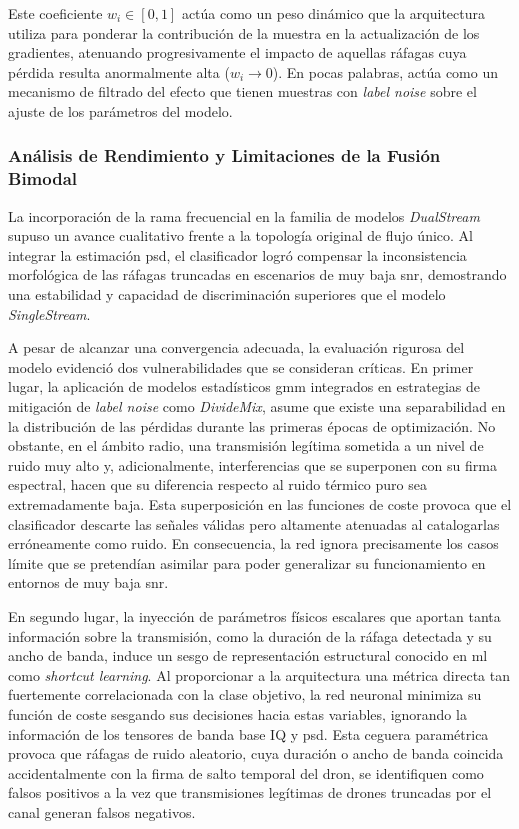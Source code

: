 Este coeficiente $w_i \in [0, 1]$ actúa como un peso dinámico que la arquitectura utiliza para ponderar la contribución de la muestra en la actualización de los gradientes, atenuando progresivamente el impacto de aquellas ráfagas cuya pérdida resulta anormalmente alta ($w_i \to 0$). En pocas palabras, actúa como un mecanismo de filtrado del efecto que tienen muestras con \textit{label noise} sobre el ajuste de los parámetros del modelo.

\subsubsection{Análisis de Rendimiento y Limitaciones de la Fusión Bimodal}
La incorporación de la rama frecuencial en la familia de modelos \textit{DualStream} supuso un avance cualitativo frente a la topología original de flujo único. Al integrar la estimación \gls{psd}, el clasificador logró compensar la inconsistencia morfológica de las ráfagas truncadas en escenarios de muy baja \gls{snr}, demostrando una estabilidad y capacidad de discriminación superiores que el modelo \textit{SingleStream}.

A pesar de alcanzar una convergencia adecuada, la evaluación rigurosa del modelo evidenció dos vulnerabilidades que se consideran críticas. En primer lugar, la aplicación de modelos estadísticos \gls{gmm} integrados en estrategias de mitigación de \textit{label noise} como \textit{DivideMix}, asume que existe una separabilidad en la distribución de las pérdidas durante las primeras épocas de optimización. No obstante, en el ámbito radio, una transmisión legítima sometida a un nivel de ruido muy alto y, adicionalmente, interferencias que se superponen con su firma espectral, hacen que su diferencia respecto al ruido térmico puro sea extremadamente baja. Esta superposición en las funciones de coste provoca que el clasificador descarte las señales válidas pero altamente atenuadas al catalogarlas erróneamente como ruido. En consecuencia, la red ignora precisamente los casos límite que se pretendían asimilar para poder generalizar su funcionamiento en entornos de muy baja \gls{snr}.

En segundo lugar, la inyección de parámetros físicos escalares que aportan tanta información sobre la transmisión, como la duración de la ráfaga detectada y su ancho de banda, induce un sesgo de representación estructural conocido en \gls{ml} como \textit{shortcut learning}. Al proporcionar a la arquitectura una métrica directa tan fuertemente correlacionada con la clase objetivo, la red neuronal minimiza su función de coste sesgando sus decisiones hacia estas variables, ignorando la información de los tensores de banda base IQ y \gls{psd}. Esta ceguera paramétrica provoca que ráfagas de ruido aleatorio, cuya duración o ancho de banda coincida accidentalmente con la firma de salto temporal del dron, se identifiquen como falsos positivos a la vez que transmisiones legítimas de drones truncadas por el canal generan falsos negativos.

